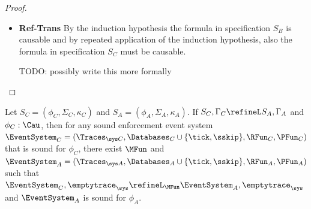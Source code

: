 \begin{proof}
\begin{itemize}
\begin{itemize}
            TODO: possibly write this more formally
            
            \item \textbf{Ref-Trans}
            By the induction hypothesis the formula in specification $S_B$
            is causable and by repeated application of the induction
            hypothesis, also the formula in specification $S_C$
            must be causable.
            
            TODO: possibly write this more formally
            
        \end{itemize}
    \end{itemize}
\end{proof}

\begin{theorem}
    \label{theo:mfotl-refinement-implies-enforcement-event-system-refinement}
    
    Let $S_C = (\phi_C, \Sigma_C, \kappa_C)$ and
    $S_A = (\phi_A, \Sigma_A, \kappa_A)$.
    If $S_C, \Gamma_C \refineL S_A, \Gamma_A$ and $\phi_C : \Cau$,
    then for any sound enforcement event system
    $\EventSystem_C =
    (\Traces_{\sys C}, \Databases_C \cup \{ \tick, \sskip \}, \RFun_C, \PFun_C)$
    that is sound for $\phi_C$,
    there exist $\MFun$ and
    $\EventSystem_A = 
    (\Traces_{\sys A}, \Databases_A \cup \{ \tick, \sskip \}, \RFun_A, \PFun_A)$
    such that
    $\EventSystem_C, \emptytrace_\sys \refineL_\MFun
    \EventSystem_A, \emptytrace_\sys$
    and $\EventSystem_A$ is sound for $\phi_A$.
\end{theorem}

